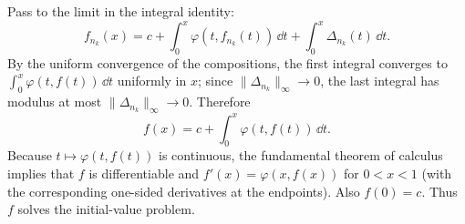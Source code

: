 \documentclass[11pt, oneside]{article}
\begin{document}
\begin{solution}
Pass to the limit in the integral identity:
\[
 f_{n_k}(x)=c+\int_0^x\varphi(t, f_{n_k}(t))\,\dd t
                  +\int_0^x\Delta_{n_k}(t)\,\dd t.
\]
By the uniform convergence of the compositions, the first integral converges to $\int_0^x\varphi(t, f(t))\,\dd t$ uniformly in $x$; since $\|\Delta_{n_k}\|_\infty\to0$, the last integral has modulus at most $\|\Delta_{n_k}\|_\infty\to0$. Therefore
\[
 f(x)=c+\int_0^x\varphi(t, f(t))\,\dd t.
\]
Because $t\mapsto\varphi(t, f(t))$ is continuous, the fundamental theorem of calculus implies that $f$ is differentiable and $f'(x)=\varphi(x, f(x))$ for $0<x<1$ (with the corresponding one-sided derivatives at the endpoints). Also $f(0)=c$. Thus $f$ solves the initial-value problem.

\end{solution}
\end{document}
